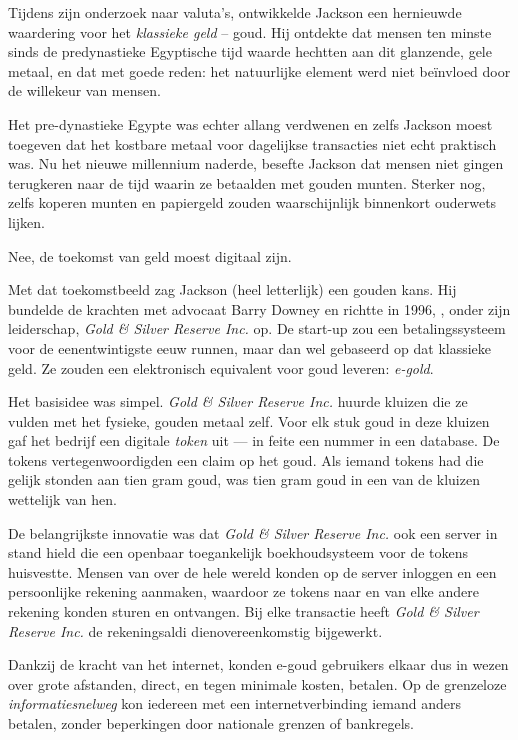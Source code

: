 \documentclass[
  a5paper,
  smalldemyvopaper,11pt,twoside,onecolumn,openright,extrafontsizes,
hidelinks]{memoir}
\begin{document}
Tijdens zijn onderzoek naar valuta's, ontwikkelde Jackson een hernieuwde
waardering voor het \emph{klassieke geld} -- goud. Hij ontdekte dat
mensen ten minste sinds de predynastieke Egyptische tijd waarde hechtten
aan dit glanzende, gele metaal, en dat met goede reden: het natuurlijke
element werd niet beïnvloed door de willekeur van mensen.

Het pre-dynastieke Egypte was echter allang verdwenen en zelfs Jackson
moest toegeven dat het kostbare metaal voor dagelijkse transacties niet
echt praktisch was. Nu het nieuwe millennium naderde, besefte Jackson
dat mensen niet gingen terugkeren naar de tijd waarin ze betaalden met
gouden munten. Sterker nog, zelfs koperen munten en papiergeld zouden
waarschijnlijk binnenkort ouderwets lijken.

Nee, de toekomst van geld moest digitaal zijn.

Met dat toekomstbeeld zag Jackson (heel letterlijk) een gouden kans. Hij
bundelde de krachten met advocaat Barry Downey en richtte in 1996, ,
onder zijn leiderschap, \emph{Gold \& Silver Reserve Inc.} op. De
start-up zou een betalingssysteem voor de eenentwintigste eeuw runnen,
maar dan wel gebaseerd op dat klassieke geld. Ze zouden een elektronisch
equivalent voor goud leveren: \emph{e-gold}.

Het basisidee was simpel. \emph{Gold \& Silver Reserve Inc.} huurde
kluizen die ze vulden met het fysieke, gouden metaal zelf. Voor elk stuk
goud in deze kluizen gaf het bedrijf een digitale \emph{token} uit ---
in feite een nummer in een database. De tokens vertegenwoordigden een
claim op het goud. Als iemand tokens had die gelijk stonden aan tien
gram goud, was tien gram goud in een van de kluizen wettelijk van hen.

De belangrijkste innovatie was dat \emph{Gold \& Silver Reserve Inc.}
ook een server in stand hield die een openbaar toegankelijk
boekhoudsysteem voor de tokens huisvestte. Mensen van over de hele
wereld konden op de server inloggen en een persoonlijke rekening
aanmaken, waardoor ze tokens naar en van elke andere rekening konden
sturen en ontvangen. Bij elke transactie heeft \emph{Gold \& Silver
Reserve Inc.} de rekeningsaldi dienovereenkomstig bijgewerkt.

Dankzij de kracht van het internet, konden e-goud gebruikers elkaar dus
in wezen over grote afstanden, direct, en tegen minimale kosten,
betalen. Op de grenzeloze \emph{informatiesnelweg} kon iedereen met een
internetverbinding iemand anders betalen, zonder beperkingen door
nationale grenzen of bankregels.
\end{document}

